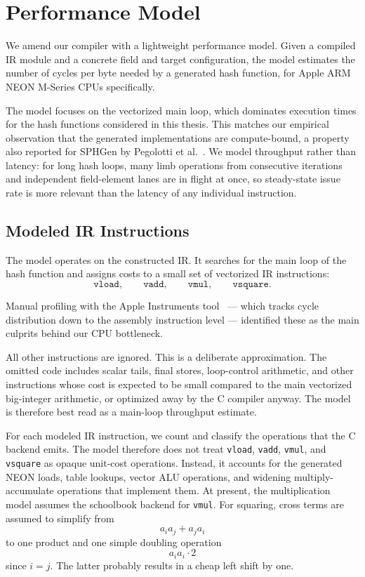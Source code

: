 \chapter{Performance Model}
\label{ch:performance-model}

We amend our compiler with a lightweight performance model. Given a compiled IR module and a concrete field and target configuration, the model estimates the number of cycles per byte needed by a generated hash function, for Apple ARM NEON M-Series CPUs specifically.

The model focuses on the vectorized main loop, which dominates execution times for the hash functions considered in this thesis. This matches our empirical observation that the generated implementations are compute-bound, a property also reported for SPHGen by Pegolotti et al.~\cite{pegolotti2026sphgen}. We model throughput rather than latency: for long hash loops, many limb operations from consecutive iterations and independent field-element lanes are in flight at once, so steady-state issue rate is more relevant than the latency of any individual instruction.

\section{Modeled IR Instructions}
\label{sec:modeled-ir-instructions}

The model operates on the constructed IR. It searches for the main loop of the hash function and assigns costs to a small set of vectorized IR instructions:
\[
    \texttt{vload},\qquad
    \texttt{vadd},\qquad
    \texttt{vmul},\qquad
    \texttt{vsquare}.
\]

Manual profiling with the Apple Instruments tool~\cite{appleInstrumentsProfiling} --- which tracks cycle distribution down to the assembly instruction level --- identified these as the main culprits behind our CPU bottleneck.

All other instructions are ignored. This is a deliberate approximation. The omitted code includes scalar tails, final stores, loop-control arithmetic, and other instructions whose cost is expected to be small compared to the main vectorized big-integer arithmetic, or optimized away by the C compiler anyway. The model is therefore best read as a main-loop throughput estimate.

For each modeled IR instruction, we count and classify the operations that the C backend emits. The model therefore does not treat \texttt{vload}, \texttt{vadd}, \texttt{vmul}, and \texttt{vsquare} as opaque unit-cost operations. Instead, it accounts for the generated NEON loads, table lookups, vector ALU operations, and widening multiply-accumulate operations that implement them. At present, the multiplication model assumes the schoolbook backend for \texttt{vmul}. For squaring, cross terms are assumed to simplify from
\[
    a_i a_j + a_j a_i
\]
to one product and one simple doubling operation
\[
    a_i a_i \cdot 2
\]
since $i = j$. The latter probably results in a cheap left shift by one.

